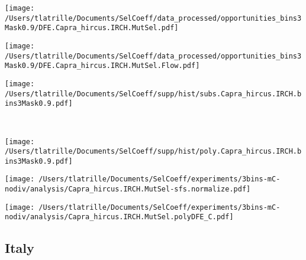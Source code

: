\documentclass{article}
\begin{document}
    \begin{minipage}{0.32\linewidth}
        \texttt{[image: /Users/tlatrille/Documents/SelCoeff/data\_processed/opportunities\_bins3Mask0.9/DFE.Capra\_hircus.IRCH.MutSel.pdf]}
    \end{minipage}
    \begin{minipage}{0.32\linewidth}
        \texttt{[image: /Users/tlatrille/Documents/SelCoeff/data\_processed/opportunities\_bins3Mask0.9/DFE.Capra\_hircus.IRCH.MutSel.Flow.pdf]}
    \end{minipage}
    \begin{minipage}{0.32\linewidth}
        \texttt{[image: /Users/tlatrille/Documents/SelCoeff/supp/hist/subs.Capra\_hircus.IRCH.bins3Mask0.9.pdf]}
    \end{minipage}
    \\
    \begin{minipage}{0.32\linewidth}
        \texttt{[image: /Users/tlatrille/Documents/SelCoeff/supp/hist/poly.Capra\_hircus.IRCH.bins3Mask0.9.pdf]}
    \end{minipage}
    \begin{minipage}{0.32\linewidth}
        \texttt{[image: /Users/tlatrille/Documents/SelCoeff/experiments/3bins-mC-nodiv/analysis/Capra\_hircus.IRCH.MutSel-sfs.normalize.pdf]}
    \end{minipage}
    \begin{minipage}{0.32\linewidth}
        \texttt{[image: /Users/tlatrille/Documents/SelCoeff/experiments/3bins-mC-nodiv/analysis/Capra\_hircus.IRCH.MutSel.polyDFE\_C.pdf]}
    \end{minipage}
    \subsection{Italy}
\end{document}
